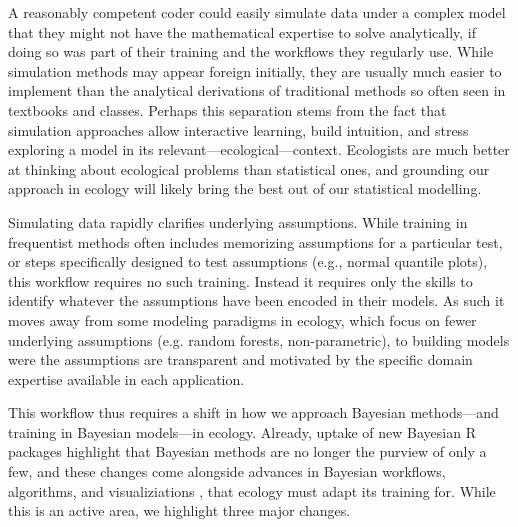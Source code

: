 \documentclass[11pt]{article}
\begin{document}
A reasonably competent coder could easily simulate data under a complex model that they might not have the mathematical expertise to solve analytically, if doing so was part of their training and the workflows they regularly use. While simulation methods may appear foreign initially, they are usually much easier to implement than the analytical derivations of traditional methods so often seen in textbooks and classes.  Perhaps this separation stems from the fact that simulation approaches allow interactive learning, build intuition, and stress exploring a model in its relevant---ecological---context. Ecologists are much better at thinking about ecological problems than statistical ones, and grounding our approach in ecology will likely bring the best out of our statistical modelling. %

Simulating data rapidly clarifies underlying assumptions. While training in frequentist methods often includes memorizing assumptions for a particular test, or steps specifically designed to test assumptions (e.g., normal quantile plots), this workflow requires no such training. Instead it requires only the skills to identify whatever the assumptions have been encoded in their models. As such it moves away from some modeling paradigms in ecology, which focus on fewer underlying assumptions (e.g. random forests, non-parametric), to building models were the assumptions are transparent and motivated by the specific domain expertise available in each application. %

This workflow thus requires a shift in how we approach Bayesian methods---and training in Bayesian models---in ecology. Already, uptake of new Bayesian \textsf{R} packages highlight that Bayesian methods are no longer the purview of only a few, and these changes come alongside advances in Bayesian workflows, algorithms, and visualiziations \citep[e.g.][]{betanworkflow,vandeschoot2021,gabryvis}, that ecology must adapt its training for. While this is an active area, we highlight three major changes.
\end{document}
